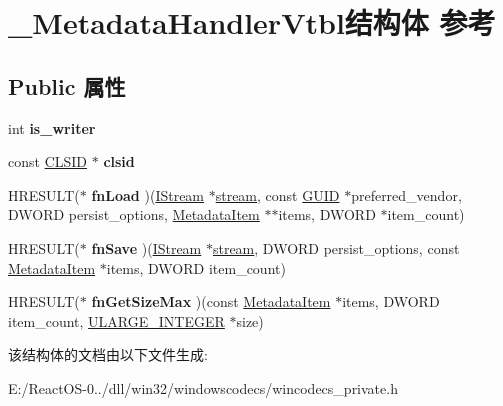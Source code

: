 \hypertarget{struct___metadata_handler_vtbl}{}\section{\+\_\+\+Metadata\+Handler\+Vtbl结构体 参考}
\label{struct___metadata_handler_vtbl}
\subsection*{Public 属性}
\begin{DoxyCompactItemize}
\item 
\mbox{\label{struct___metadata_handler_vtbl_a12ec41e01f787a5994938d58a1c6ecb2}} 
int {\bfseries is\+\_\+writer}
\item 
\mbox{\label{struct___metadata_handler_vtbl_a8adb3e442b107bb1bdd64229f2f23025}} 
const \hyperlink{struct___i_i_d}{C\+L\+S\+ID} $\ast$ {\bfseries clsid}
\item 
\mbox{\label{struct___metadata_handler_vtbl_a6ff89129dc9207b6fde181edcbfb3af0}} 
H\+R\+E\+S\+U\+LT($\ast$ {\bfseries fn\+Load} )(\hyperlink{interface_i_stream}{I\+Stream} $\ast$\hyperlink{structstream}{stream}, const \hyperlink{interface_g_u_i_d}{G\+U\+ID} $\ast$preferred\+\_\+vendor, D\+W\+O\+RD persist\+\_\+options, \hyperlink{struct___metadata_item}{Metadata\+Item} $\ast$$\ast$items, D\+W\+O\+RD $\ast$item\+\_\+count)
\item 
\mbox{\label{struct___metadata_handler_vtbl_a6ffce94ab3ab9cd3fe7f6f4e242f47c2}} 
H\+R\+E\+S\+U\+LT($\ast$ {\bfseries fn\+Save} )(\hyperlink{interface_i_stream}{I\+Stream} $\ast$\hyperlink{structstream}{stream}, D\+W\+O\+RD persist\+\_\+options, const \hyperlink{struct___metadata_item}{Metadata\+Item} $\ast$items, D\+W\+O\+RD item\+\_\+count)
\item 
\mbox{\label{struct___metadata_handler_vtbl_af61d5e456feaea3fca322b82ef04c4e5}} 
H\+R\+E\+S\+U\+LT($\ast$ {\bfseries fn\+Get\+Size\+Max} )(const \hyperlink{struct___metadata_item}{Metadata\+Item} $\ast$items, D\+W\+O\+RD item\+\_\+count, \hyperlink{struct___u_l_a_r_g_e___i_n_t_e_g_e_r}{U\+L\+A\+R\+G\+E\+\_\+\+I\+N\+T\+E\+G\+ER} $\ast$size)
\end{DoxyCompactItemize}


该结构体的文档由以下文件生成\+:\begin{DoxyCompactItemize}
\item 
E\+:/\+React\+O\+S-\/0../dll/win32/windowscodecs/wincodecs\+\_\+private.\+h\end{DoxyCompactItemize}
